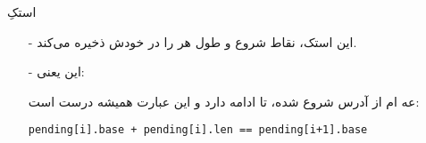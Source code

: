 \begin{frame}{استکِ }
\begin{itemize}\itemr
\item[-]
این استک، نقاط شروع و طول هر  را در خودش ذخیره می‌کند.

\item[-]
این یعنی:

 عه
ام
از آدرس
شروع شده،
تا ادامه دارد و این عبارت همیشه درست است:
\begin{latin}
\begin{flushleft}
\texttt{pending[i].base + pending[i].len == pending[i+1].base}
\end{flushleft}
\end{latin}
\end{itemize}
\end{frame}

